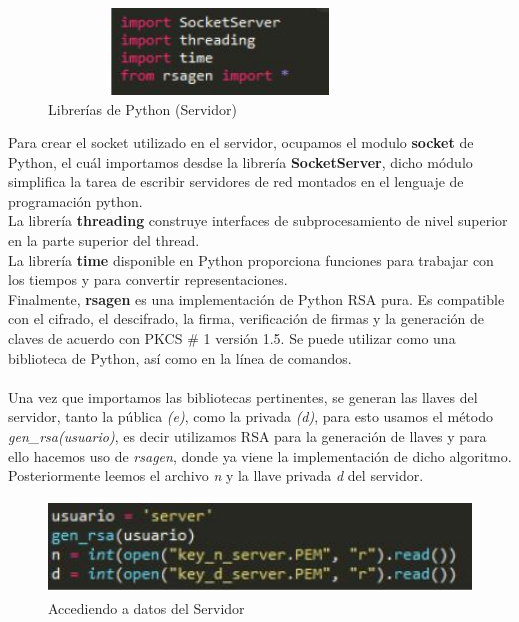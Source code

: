 			\begin{figure}[H]
			\centering
			\includegraphics[width=9cm, height=2.3cm]{./images/servidor/01.jpg}
			\caption{Librerías de Python (Servidor)}
			\label{fig:6-1-1} 
			\end{figure}

Para crear el socket utilizado en el servidor, ocupamos el modulo \textbf{socket} de Python, el cuál importamos desdse la librería \textbf{SocketServer}, dicho módulo simplifica la tarea de escribir servidores de red montados en el lenguaje de programación python. \\ La librería \textbf{threading} construye interfaces de subprocesamiento de nivel superior en la parte superior del thread.\\
La librería \textbf{time} disponible en Python proporciona funciones para trabajar con los tiempos y para convertir representaciones. \\
Finalmente,\textbf{ rsagen} es una implementación de Python RSA pura. Es compatible con el cifrado,  el descifrado, la firma, verificación de firmas y la generación de claves de acuerdo con PKCS \# 1 versión 1.5. Se puede utilizar como una biblioteca de Python, así como en la línea de comandos.
\\ \\ 

Una vez que importamos las bibliotecas pertinentes, se generan las llaves del servidor, tanto la pública \textit{(e)}, como la privada \textit{(d)}, para esto usamos el método \textit{gen\_rsa(usuario)}, es decir utilizamos RSA para la generación de llaves y para ello hacemos uso de \textit{rsagen}, donde ya viene la implementación de dicho algoritmo. \\ 

Posteriormente leemos el archivo \textit{n} y la llave privada \textit{d} del servidor.
			\begin{figure}[H]
			\centering
			\includegraphics[width=12cm, height=2.5cm]{./images/servidor/02.jpg}
			\caption{Accediendo a datos del Servidor}
			\label{fig:6-1-2} 
			\end{figure}

